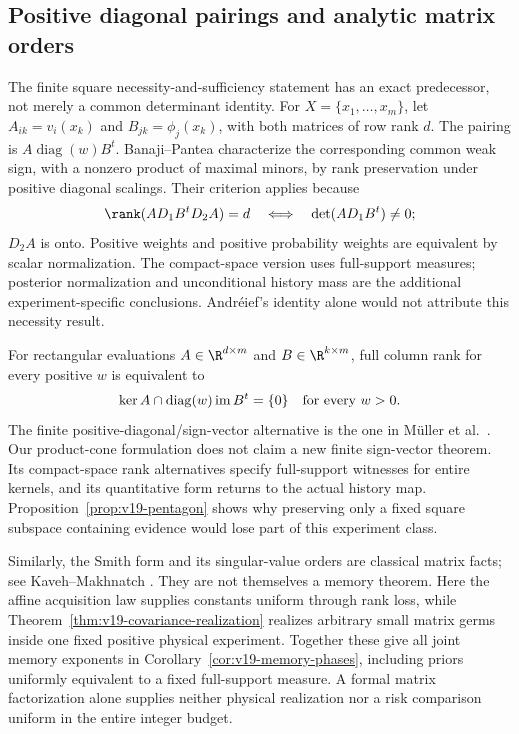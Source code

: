 \subsection{Positive diagonal pairings and analytic matrix orders}
\label{sec:v19-comparison}
The finite square necessity-and-sufficiency statement has an exact
predecessor, not merely a common determinant identity. For
$X=\{x_1,\ldots,x_m\}$, let
$A_{ik}=v_i(x_k)$ and $B_{jk}=\phi_j(x_k)$, with both matrices of
row rank $d$. The pairing is $A\operatorname{diag}(w)B^t$.
Banaji--Pantea \cite[Definition 2.24 and Lemma 2.36]{BanajiPantea2016}
characterize the corresponding common weak sign, with a nonzero
product of maximal minors, by rank preservation under positive
diagonal scalings. Their criterion applies because
\[
 \rank(AD_1B^tD_2A)=d
       \quad\Longleftrightarrow\quad\det(AD_1B^t)\ne0;
\]
$D_2A$ is onto. Positive weights and positive probability weights
are equivalent by scalar normalization. The compact-space version
uses full-support measures; posterior normalization and unconditional
history mass are the additional experiment-specific conclusions.
Andr\'eief's identity alone would not attribute this necessity result.

For rectangular evaluations $A\in\R^{d\times m}$ and
$B\in\R^{k\times m}$, full column rank for every positive $w$ is
equivalent to
\[
 \ker A\cap\operatorname{diag}(w)\operatorname{im}B^t=\{0\}
                     \quad\hbox{for every }w>0.
\]
The finite positive-diagonal/sign-vector alternative is the one in
M\"uller et al.\ \cite[Lemma 2.1]{MullerEtAl2016}. Our product-cone
formulation does not claim a new finite sign-vector theorem. Its
compact-space rank alternatives specify full-support witnesses for
entire kernels, and its quantitative form returns to the actual
history map. Proposition~\ref{prop:v19-pentagon} shows why preserving
only a fixed square subspace containing evidence would lose part of
this experiment class.

Similarly, the Smith form and its singular-value orders are classical
matrix facts; see Kaveh--Makhnatch \cite[Theorem 1.1]{KavehMakhnatch}.
They are not themselves a memory theorem. Here the affine acquisition
law supplies constants uniform through rank loss, while
Theorem~\ref{thm:v19-covariance-realization} realizes arbitrary small
matrix germs inside one fixed positive physical experiment. Together
these give all joint memory exponents in
Corollary~\ref{cor:v19-memory-phases}, including priors uniformly
equivalent to a fixed full-support measure. A formal matrix
factorization alone supplies neither physical realization nor a risk
comparison uniform in the entire integer budget.


